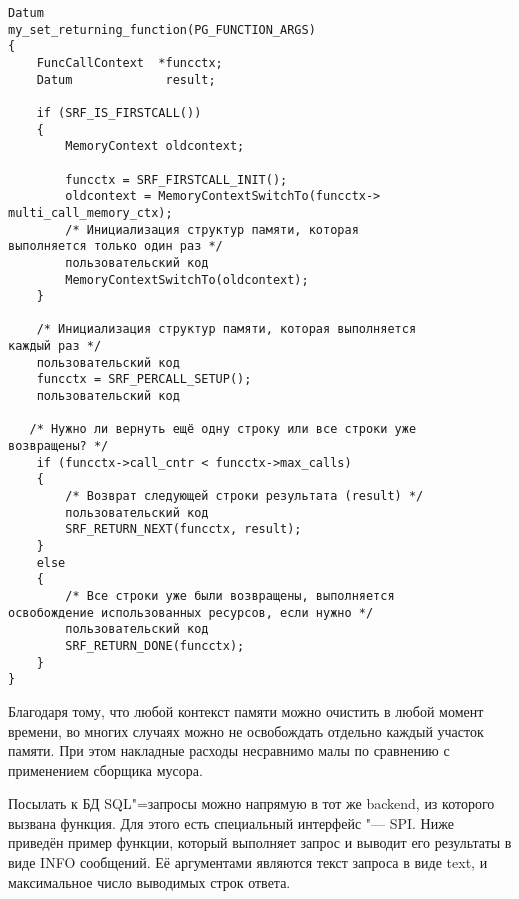 \documentclass[10pt, a5paper]{article}
\begin{document}
\begin{verbatim}
Datum
my_set_returning_function(PG_FUNCTION_ARGS)
{
    FuncCallContext  *funcctx;
    Datum             result;
    
    if (SRF_IS_FIRSTCALL())
    {
        MemoryContext oldcontext;

        funcctx = SRF_FIRSTCALL_INIT();
        oldcontext = MemoryContextSwitchTo(funcctx->
multi_call_memory_ctx);
        /* Инициализация структур памяти, которая 
выполняется только один раз */
        пользовательский код
        MemoryContextSwitchTo(oldcontext);
    }

    /* Инициализация структур памяти, которая выполняется 
каждый раз */
    пользовательский код
    funcctx = SRF_PERCALL_SETUP();
    пользовательский код

   /* Нужно ли вернуть ещё одну строку или все строки уже 
возвращены? */
    if (funcctx->call_cntr < funcctx->max_calls)
    {
        /* Возврат следующей строки результата (result) */
        пользовательский код
        SRF_RETURN_NEXT(funcctx, result);
    }
    else
    {
        /* Все строки уже были возвращены, выполняется 
освобождение использованных ресурсов, если нужно */
        пользовательский код
        SRF_RETURN_DONE(funcctx);
    }
}\end{verbatim}
Благодаря тому, что любой контекст памяти можно очистить в любой момент времени, во многих случаях можно не освобождать отдельно каждый участок памяти. При этом накладные расходы несравнимо малы по сравнению с применением сборщика мусора.

Посылать к БД SQL"=запросы можно напрямую в тот же backend, из которого вызвана функция. Для этого есть специальный интерфейс "--- SPI. Ниже приведён пример функции, который выполняет запрос и выводит его результаты в виде INFO сообщений. Её аргументами являются текст запроса в виде text, и максимальное число выводимых строк ответа.
\end{document}
